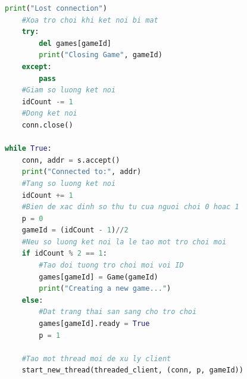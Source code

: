 \documentclass[a4paper]{article}
\begin{document}
\begin{mdframed}[hidealllines=true,backgroundcolor=magenta!10]
\begin{lstlisting}[language=Python]
    print("Lost connection")
    #Xoa tro choi khi ket noi bi mat
    try:
        del games[gameId]
        print("Closing Game", gameId)
    except:
        pass
    #Giam so luong ket noi 
    idCount -= 1
    #Dong ket noi 
    conn.close()

while True:
    conn, addr = s.accept()
    print("Connected to:", addr)
    #Tang so luong ket noi
    idCount += 1
    #Bien de xac dinh so thu tu cua nguoi choi 0 hoac 1
    p = 0
    gameId = (idCount - 1)//2
    #Neu so luong ket noi la le tao mot tro choi moi 
    if idCount % 2 == 1:
        #Tao doi tuong tro choi moi voi ID
        games[gameId] = Game(gameId)
        print("Creating a new game...")
    else:
        #Dat trang thai san sang cho tro choi
        games[gameId].ready = True
        p = 1

    #Tao mot thread moi de xu ly client
    start_new_thread(threaded_client, (conn, p, gameId))
	\end{lstlisting}
    \end{mdframed}
\end{document}
